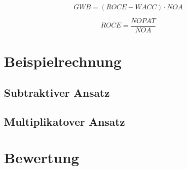 \begin{equation}
    GWB = (ROCE - WACC) \cdot NOA
    \label{eq:mupliplikativ-gwb-geschaeftswertbeitrag}
\end{equation}

\begin{equation}
    ROCE = \frac{NOPAT}{NOA}
    \label{eq:mupliplikativ-roce-geschaeftswertbeitrag}
\end{equation}

\section{Beispielrechnung}

\subsection{Subtraktiver Ansatz}

\subsection{Multiplikatover Ansatz}

\section{Bewertung}
